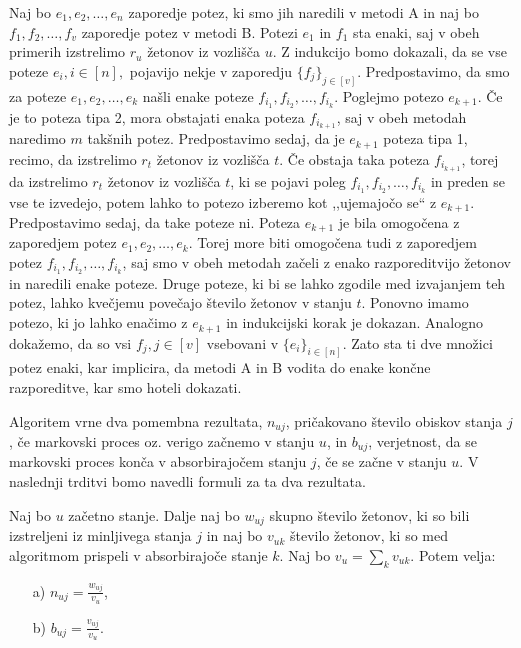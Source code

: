 \documentclass[twoside,11pt]{article}
\begin{document}
\indent Naj bo $e_{1},e_{2},\ldots,e_{n}$ zaporedje potez, ki smo jih naredili v metodi A in naj bo $f_{1},f_{2},\ldots,f_{v}$ zaporedje potez v metodi B. Potezi $e_{1}$ in $f_{1}$ sta enaki, saj v obeh primerih izstrelimo $r_{u}$ žetonov iz vozlišča $u$. Z indukcijo bomo dokazali, da se vse poteze $e_{i}, i \in [n], $ pojavijo nekje v zaporedju $\{ f_{j}\} _{j\in [v] }$. Predpostavimo, da smo za poteze $e_{1},e_{2},\ldots,e_{k}$ našli enake poteze $f_{i_1},f_{i_2},\ldots,f_{i_k}$. Poglejmo potezo $e_{k+1}$. Če je to poteza tipa 2, mora obstajati enaka poteza $f_{i_{k+1}}$, saj v obeh metodah naredimo $m$ takšnih potez.
Predpostavimo sedaj, da je $e_{k+1}$ poteza tipa 1, recimo, da izstrelimo $r_{t}$ žetonov iz vozlišča $t$. Če obstaja taka poteza $f_{i_{k+1}}$, torej da izstrelimo $r_{t}$ žetonov iz vozlišča $t$, ki se pojavi poleg $f_{i_1},f_{i_2},\ldots,f_{i_k}$ in preden se vse te izvedejo, potem lahko to potezo izberemo kot ,,ujemajočo se`` z $e_{k+1}$. Predpostavimo sedaj, da take poteze ni. Poteza $e_{k+1}$ je bila omogočena z zaporedjem potez $e_{1},e_{2},\ldots,e_{k}$. Torej more biti omogočena tudi z zaporedjem potez $f_{i_1},f_{i_2},\ldots,f_{i_k}$, saj smo v obeh metodah začeli z enako razporeditvijo žetonov in naredili enake poteze. Druge poteze, ki bi se lahko zgodile med izvajanjem teh potez, lahko kvečjemu povečajo število žetonov v stanju $t$. 
Ponovno imamo potezo, ki jo lahko enačimo z $e_{k+1}$ in indukcijski korak je dokazan. Analogno dokažemo, da so vsi $f_{j}, j \in [v] $ vsebovani v $\{e_{i} \}_{i\in [n] }$. Zato sta ti dve množici potez enaki, kar implicira, da metodi A in B vodita do enake končne razporeditve, kar smo hoteli dokazati.
\hfill \QED

\vspace{\baselineskip}

Algoritem vrne dva pomembna rezultata, $n_{uj}$, pričakovano število obiskov stanja $j$, če markovski proces oz.\,\,verigo začnemo v stanju $u$, in $b_{uj}$, verjetnost, da se markovski proces konča v absorbirajočem stanju $j$, če se začne v stanju $u$. V naslednji trditvi bomo navedli formuli za ta dva rezultata.

\begin{trditev}\label{formule}
    Naj bo $u$ začetno stanje. Dalje naj bo $w_{uj}$ skupno število žetonov, ki so bili izstreljeni iz minljivega stanja $j$ in naj bo $v_{uk}$ število žetonov, ki so med algoritmom prispeli v absorbirajoče stanje $k$. Naj bo $v_{u} = \sum_{k} v_{uk}$. Potem velja: 
    \begin{enumerate}
        \item[a)] $n_{uj} = \frac{w_{uj}}{v_{u}}$,
        \item[b)] $b_{uj} = \frac{v_{uj}}{v_{u}}$.
    \end{enumerate}

\end{trditev}
\end{document}
